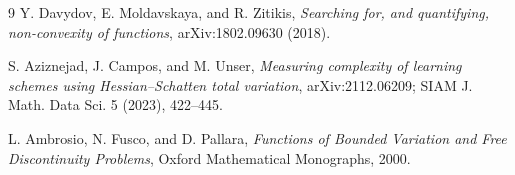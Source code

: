 \documentclass[11pt]{article}
\begin{document}
\begin{thebibliography}{9}
Y. Davydov, E. Moldavskaya, and R. Zitikis,
\emph{Searching for, and quantifying, non-convexity of functions},
arXiv:1802.09630 (2018).

S. Aziznejad, J. Campos, and M. Unser,
\emph{Measuring complexity of learning schemes using Hessian--Schatten total
variation}, arXiv:2112.06209; SIAM J. Math. Data Sci. 5 (2023), 422--445.

L. Ambrosio, N. Fusco, and D. Pallara,
\emph{Functions of Bounded Variation and Free Discontinuity Problems},
Oxford Mathematical Monographs, 2000.
\end{thebibliography}
\end{document}
